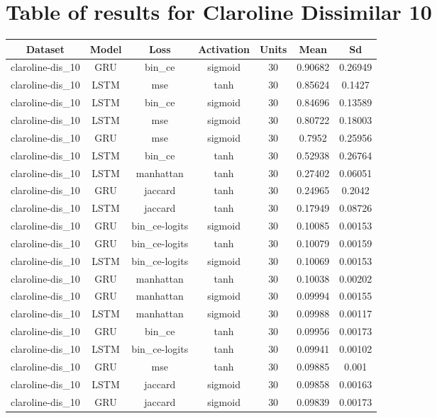 \documentclass{article}%
\begin{document}
\section{Table of results for Claroline Dissimilar 10}%
\label{sec:TableofresultsforClarolineDissimilar10}%
\begin{longtable}{|c|c|c|c|c|c|c|}%
\hline%
\rowcolor{lightgray!70}%
\textbf{Dataset}&\textbf{Model}&\textbf{Loss}&\textbf{Activation}&\textbf{Units}&\textbf{Mean}&\textbf{Sd}\\%
\hline%
claroline{-}dis\_10&GRU&bin\_ce&sigmoid&30&0.90682&0.26949\\%
\hline%
claroline{-}dis\_10&LSTM&mse&tanh&30&0.85624&0.1427\\%
\hline%
claroline{-}dis\_10&LSTM&bin\_ce&sigmoid&30&0.84696&0.13589\\%
\hline%
claroline{-}dis\_10&LSTM&mse&sigmoid&30&0.80722&0.18003\\%
\hline%
claroline{-}dis\_10&GRU&mse&sigmoid&30&0.7952&0.25956\\%
\hline%
claroline{-}dis\_10&LSTM&bin\_ce&tanh&30&0.52938&0.26764\\%
\hline%
claroline{-}dis\_10&LSTM&manhattan&tanh&30&0.27402&0.06051\\%
\hline%
claroline{-}dis\_10&GRU&jaccard&tanh&30&0.24965&0.2042\\%
\hline%
claroline{-}dis\_10&LSTM&jaccard&tanh&30&0.17949&0.08726\\%
\hline%
claroline{-}dis\_10&GRU&bin\_ce{-}logits&sigmoid&30&0.10085&0.00153\\%
\hline%
claroline{-}dis\_10&GRU&bin\_ce{-}logits&tanh&30&0.10079&0.00159\\%
\hline%
claroline{-}dis\_10&LSTM&bin\_ce{-}logits&sigmoid&30&0.10069&0.00153\\%
\hline%
claroline{-}dis\_10&GRU&manhattan&tanh&30&0.10038&0.00202\\%
\hline%
claroline{-}dis\_10&GRU&manhattan&sigmoid&30&0.09994&0.00155\\%
\hline%
claroline{-}dis\_10&LSTM&manhattan&sigmoid&30&0.09988&0.00117\\%
\hline%
claroline{-}dis\_10&GRU&bin\_ce&tanh&30&0.09956&0.00173\\%
\hline%
claroline{-}dis\_10&LSTM&bin\_ce{-}logits&tanh&30&0.09941&0.00102\\%
\hline%
claroline{-}dis\_10&GRU&mse&tanh&30&0.09885&0.001\\%
\hline%
claroline{-}dis\_10&LSTM&jaccard&sigmoid&30&0.09858&0.00163\\%
\hline%
claroline{-}dis\_10&GRU&jaccard&sigmoid&30&0.09839&0.00173\\%
\hline%
\end{longtable}
\end{document}
